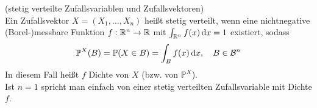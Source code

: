 \begin{Definition}(stetig verteilte Zufallsvariablen und Zufallsvektoren)\\
	Ein Zufallsvektor $ X = (X_1,\dots,X_n) $ heißt stetig verteilt, wenn eine nichtnegative (Borel-)messbare Funktion $ f : \mathbb{R}^n \to \mathbb{R} $ mit $ \int_{\mathbb{R}^n} f(x) \, \mathrm{d} x =1  $ existiert, sodass 
	\[
		\mathbb{P}^X(B) = \mathbb{P}(X \in B) =  \int_{B} f(x) \, \mathrm{d} x, \quad B \in \mathcal{B}^n
	\]
	In diesem Fall heißt $ f $ Dichte von $ X $ (bzw. von $ \mathbb{P}^X $).\\
	Ist $ n=1 $ spricht man einfach von einer stetig verteilten Zufallsvariable mit Dichte $ f $.
	
\end{Definition}

